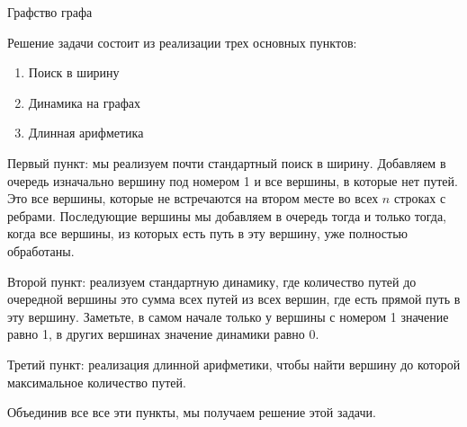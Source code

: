 \begin{tutorial}{Графство графа}

Решение задачи состоит из реализации трех основных пунктов:
\begin{enumerate}
\item Поиск в ширину
\item Динамика на графах
\item Длинная арифметика
\end{enumerate}

Первый пункт: мы реализуем почти стандартный поиск в ширину. Добавляем в очередь изначально вершину под номером 1 и все вершины, в которые нет путей. Это все вершины, которые не встречаются на втором месте во всех $n$ строках с ребрами. Последующие вершины мы добавляем в очередь тогда и только тогда, когда все вершины, из которых есть путь в эту вершину, уже полностью обработаны. 

Второй пункт: реализуем стандартную динамику, где количество путей до очередной вершины это сумма всех путей из всех вершин, где есть прямой путь в эту вершину. Заметьте, в самом начале только у вершины с номером 1 значение равно 1, в других вершинах значение динамики равно 0.

Третий пункт: реализация длинной арифметики, чтобы найти вершину до которой максимальное количество путей.

Объединив все все эти пункты, мы получаем решение этой задачи.

\end{tutorial}
